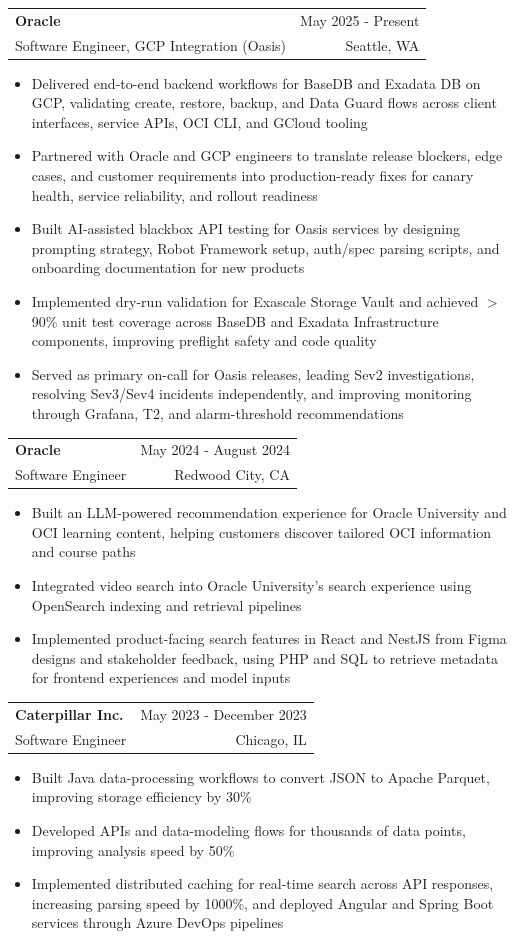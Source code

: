 \documentclass[letterpaper,11pt]{article}
\makeatletter
\newcommand{\resumeItem}[1]{
  \item\small{
    {#1 \vspace{-2pt}}
  }
}
\newcommand{\resumeSubheading}[4]{
  \vspace{-2pt}\item
    \begin{tabular*}{0.97\textwidth}[t]{l@{\extracolsep{\fill}}r}
      \textbf{#1} & #2 \\
      {\small#3} & {\small #4} \\
    \end{tabular*}\vspace{-7pt}
}
\newcommand{\resumeItemListStart}{\begin{itemize}}
\newcommand{\resumeItemListEnd}{\end{itemize}\vspace{-5pt}}
\makeatother
\begin{document}
    \resumeSubheading
  {Oracle}{May 2025 - Present}
  {Software Engineer, GCP Integration (Oasis)}{Seattle, WA}
  \resumeItemListStart
    \resumeItem{Delivered end-to-end backend workflows for BaseDB and Exadata DB on GCP, validating create, restore, backup, and Data Guard flows across client interfaces, service APIs, OCI CLI, and GCloud tooling}
    \resumeItem{Partnered with Oracle and GCP engineers to translate release blockers, edge cases, and customer requirements into production-ready fixes for canary health, service reliability, and rollout readiness}
    \resumeItem{Built AI-assisted blackbox API testing for Oasis services by designing prompting strategy, Robot Framework setup, auth/spec parsing scripts, and onboarding documentation for new products}
    \resumeItem{Implemented dry-run validation for Exascale Storage Vault and achieved $>$90\% unit test coverage across BaseDB and Exadata Infrastructure components, improving preflight safety and code quality}
    \resumeItem{Served as primary on-call for Oasis releases, leading Sev2 investigations, resolving Sev3/Sev4 incidents independently, and improving monitoring through Grafana, T2, and alarm-threshold recommendations}
  \resumeItemListEnd

    \resumeSubheading
      {Oracle}{May 2024 - August 2024}
      {Software Engineer}{Redwood City, CA}
      \resumeItemListStart
        \resumeItem{Built an LLM-powered recommendation experience for Oracle University and OCI learning content, helping customers discover tailored OCI information and course paths}
        \resumeItem{Integrated video search into Oracle University's search experience using OpenSearch indexing and retrieval pipelines}
        \resumeItem{Implemented product-facing search features in React and NestJS from Figma designs and stakeholder feedback, using PHP and SQL to retrieve metadata for frontend experiences and model inputs}
      \resumeItemListEnd

    \resumeSubheading
      {Caterpillar Inc.}{May 2023 - December 2023}
      {Software Engineer}{Chicago, IL}
      \resumeItemListStart
        \resumeItem{Built Java data-processing workflows to convert JSON to Apache Parquet, improving storage efficiency by 30\%}
        \resumeItem{Developed APIs and data-modeling flows for thousands of data points, improving analysis speed by 50\%}
        \resumeItem{Implemented distributed caching for real-time search across API responses, increasing parsing speed by 1000\%, and deployed Angular and Spring Boot services through Azure DevOps pipelines}
      \resumeItemListEnd
\end{document}
